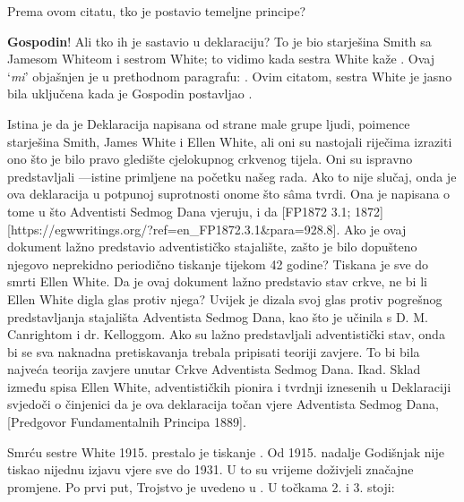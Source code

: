Prema ovom citatu, tko je postavio temeljne principe?

 \textbf{Gospodin}! Ali tko ih je sastavio u deklaraciju? To je bio starješina Smith sa Jamesom Whiteom i sestrom White; to vidimo kada sestra White kaže . Ovaj ‘\textit{mi}’ objašnjen je u prethodnom paragrafu: . Ovim citatom, sestra White je jasno bila uključena kada je Gospodin postavljao .

Istina je da je Deklaracija  napisana od strane male grupe ljudi, poimence starješina Smith, James White i Ellen White, ali oni su nastojali riječima izraziti ono što je bilo pravo gledište cjelokupnog crkvenog tijela. Oni su ispravno predstavljali —istine primljene na početku našeg rada. Ako to nije slučaj, onda je ova deklaracija u potpunoj suprotnosti onome što sâma tvrdi. Ona je napisana  o tome u što Adventisti Sedmog Dana vjeruju,  i da [FP1872 3.1; 1872][https://egwwritings.org/?ref=en\_FP1872.3.1&para=928.8]. Ako je ovaj dokument lažno predstavio adventističko stajalište, zašto je bilo dopušteno njegovo neprekidno periodično tiskanje tijekom 42 godine? Tiskana je sve do smrti Ellen White. Da je ovaj dokument lažno predstavio stav crkve, ne bi li Ellen White digla glas protiv njega? Uvijek je dizala svoj glas protiv pogrešnog predstavljanja stajališta Adventista Sedmog Dana, kao što je učinila s D. M. Canrightom i dr. Kelloggom. Ako su  lažno predstavljali adventistički stav, onda bi se sva naknadna pretiskavanja trebala pripisati teoriji zavjere. To bi bila najveća teorija zavjere unutar Crkve Adventista Sedmog Dana. Ikad. Sklad između spisa Ellen White, adventističkih pionira i tvrdnji iznesenih u Deklaraciji  svjedoči o činjenici da je ova deklaracija točan  vjere Adventista Sedmog Dana, [Predgovor Fundamentalnih Principa 1889].

Smrću sestre White 1915. prestalo je tiskanje . Od 1915. nadalje Godišnjak nije tiskao nijednu izjavu vjere sve do 1931. U to su vrijeme  doživjeli značajne promjene. Po prvi put, Trojstvo je uvedeno u . U točkama 2. i 3. stoji:

